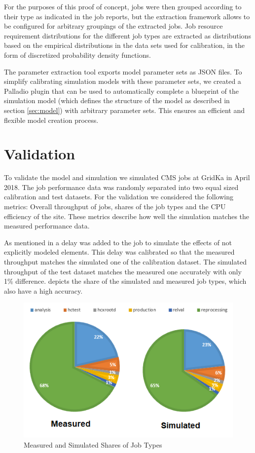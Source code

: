 \documentclass[a4paper]{jpconf}
\begin{document}
For the purposes of this proof of concept, jobs were then grouped according to their type as indicated in the job reports, but the extraction framework allows to be configured for arbitrary groupings of the extracted jobs.
Job resource requirement distributions for the different job types are extracted as distributions based on the empirical distributions in the data sets used for calibration, in the form of discretized probability density functions.

The parameter extraction tool exports model parameter sets as JSON files.
To simplify calibrating simulation models with these parameter sets, we created a Palladio plugin that can be used to automatically complete a blueprint of the simulation model (which defines the structure of the model as described in section \ref{sec:model}) with arbitrary parameter sets.
This ensures an efficient and flexible model creation process.

\section{Validation}
\label{validation}
To validate the model and simulation we simulated CMS jobs at GridKa in April 2018.
The job performance data was randomly separated into two equal sized calibration and test datasets. For the validation we considered the following metrics: Overall throughput of jobs, shares of the job types and the CPU efficiency of the site. These metrics describe how well the simulation matches the measured performance data.

As mentioned in  a delay was added to the job to simulate the effects of not explicitly modeled elements. This delay was calibrated so that the measured throughput matches the simulated one of the calibration dataset. The simulated throughput of the test dataset matches the measured one accurately with only 1\% difference.
 depicts the share of the simulated and measured job types, which also have a high accuracy.

\begin{figure}[h]
	\centering
	\includegraphics[scale = 0.6]{images/shares}
	\caption[]{Measured and Simulated Shares of Job Types}
	\label{shares}
\end{figure}
\end{document}
